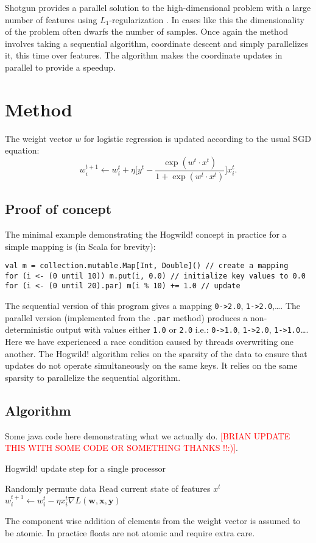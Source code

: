 \documentclass{article} %
\begin{document}
Shotgun provides a parallel solution to the high-dimensional problem with a large number of features using $L_1$-regularization \cite{ng2004feature}. In cases like this the dimensionality of the problem often dwarfs the number of samples. Once again the method involves taking a sequential algorithm, coordinate descent and simply parallelizes it, this time over features. The algorithm makes the coordinate updates in parallel to provide a speedup.

\section{Method}
The weight vector $w$ for logistic regression is updated according to the usual SGD equation:
\begin{equation}
w_i^{t+1} \leftarrow w_i^t + \eta \bigg[y^t - \frac{\exp{(w^t \cdot x^t)}}{1 + \exp{(w^t \cdot x^t)}} \bigg]x_i^t.
\end{equation}

 
\subsection{Proof of concept}
The minimal example demonstrating the Hogwild! concept in practice for a simple mapping is (in Scala for brevity):
\begin{lstlisting}
val m = collection.mutable.Map[Int, Double]() // create a mapping
for (i <- (0 until 10)) m.put(i, 0.0) // initialize key values to 0.0
for (i <- (0 until 20).par) m(i % 10) += 1.0 // update
\end{lstlisting}
The sequential version of this program gives a mapping \verb+0->2.0+, \verb+1->2.0+,\ldots. The parallel version (implemented from the \verb+.par+ method) produces a non-deterministic output with values either \verb+1.0+ or \verb+2.0+ i.e.: \verb+0->1.0+, \verb+1->2.0+, \verb+1->1.0+\ldots. Here we have experienced a race condition caused by threads overwriting one another. The Hogwild! algorithm relies on the sparsity of the data to ensure that updates do not operate simultaneously on the same keys. It relies on the same sparsity to parallelize the sequential algorithm.

\subsection{Algorithm}
Some java code here demonstrating what we actually do. \textcolor{red}{[BRIAN UPDATE THIS WITH SOME CODE OR SOMETHING THANKS !!:)]}.
\begin{algorithm}
  \caption{Hogwild! update step for a single processor}

  \begin{algorithmic}
  \Loop
  \State Randomly permute data
  \State Read current state of features $x^t$
  \State $w^{t+1}_i \leftarrow w_i^t - \eta x_i^t \nabla L(\mathbf{w}, \mathbf{x}, \mathbf{y})$
  \EndFor
  \EndLoop
  \end{algorithmic}
  \label{alg1}
\end{algorithm}
The component wise addition of elements from the weight vector is assumed to be atomic. In practice floats are not atomic and require extra care.
\end{document}
